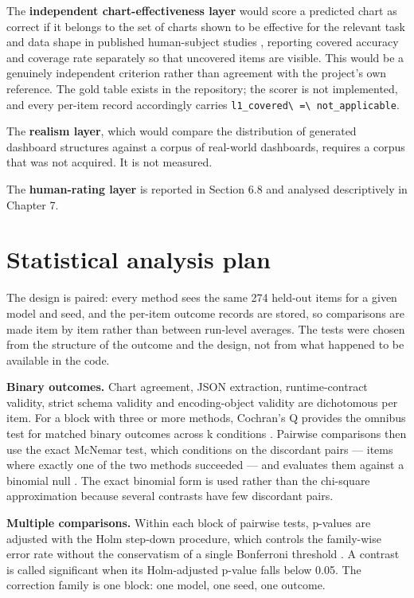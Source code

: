 The \textbf{independent chart-effectiveness layer} would score a predicted chart as correct if it belongs to the set of charts shown to be effective for the relevant task and data shape in published human-subject studies \cite{saket2019taskbased,kim2018taskdata}, reporting covered accuracy and coverage rate separately so that uncovered items are visible. This would be a genuinely independent criterion rather than agreement with the project's own reference. The gold table exists in the repository; the scorer is not implemented, and every per-item record accordingly carries \nolinkurl{l1_covered\ =\ not_applicable}.

The \textbf{realism layer}, which would compare the distribution of generated dashboard structures against a corpus of real-world dashboards, requires a corpus that was not acquired. It is not measured.

The \textbf{human-rating layer} is reported in Section 6.8 and analysed descriptively in Chapter 7.

\section{Statistical analysis plan}

The design is paired: every method sees the same 274 held-out items for a given model and seed, and the per-item outcome records are stored, so comparisons are made item by item rather than between run-level averages. The tests were chosen from the structure of the outcome and the design, not from what happened to be available in the code.

\textbf{Binary outcomes.} Chart agreement, JSON extraction, runtime-contract validity, strict schema validity and encoding-object validity are dichotomous per item. For a block with three or more methods, Cochran's Q provides the omnibus test for matched binary outcomes across k conditions \cite{cochran1950}. Pairwise comparisons then use the exact McNemar test, which conditions on the discordant pairs --- items where exactly one of the two methods succeeded --- and evaluates them against a binomial null \cite{mcnemar1947}. The exact binomial form is used rather than the chi-square approximation because several contrasts have few discordant pairs.

\textbf{Multiple comparisons.} Within each block of pairwise tests, p-values are adjusted with the Holm step-down procedure, which controls the family-wise error rate without the conservatism of a single Bonferroni threshold \cite{holm1979}. A contrast is called significant when its Holm-adjusted p-value falls below 0.05. The correction family is one block: one model, one seed, one outcome.

